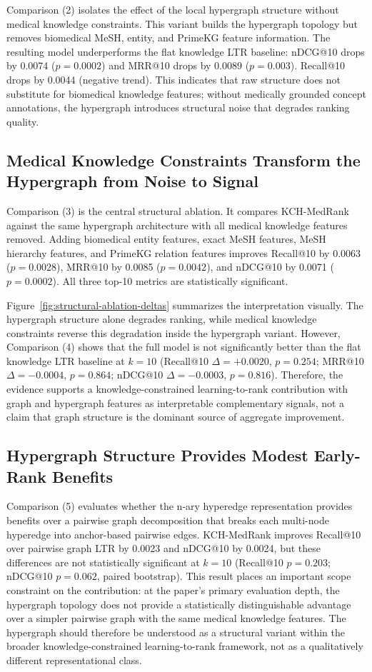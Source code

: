 Comparison (2) isolates the effect of the local hypergraph structure without medical knowledge constraints. This variant builds the hypergraph topology but removes biomedical MeSH, entity, and PrimeKG feature information. The resulting model underperforms the flat knowledge LTR baseline: nDCG@10 drops by 0.0074 ($p = 0.0002$) and MRR@10 drops by 0.0089 ($p = 0.003$). Recall@10 drops by 0.0044 (negative trend). This indicates that raw structure does not substitute for biomedical knowledge features; without medically grounded concept annotations, the hypergraph introduces structural noise that degrades ranking quality.

\subsection{Medical Knowledge Constraints Transform the Hypergraph from Noise to Signal}

Comparison (3) is the central structural ablation. It compares KCH-MedRank against the same hypergraph architecture with all medical knowledge features removed. Adding biomedical entity features, exact MeSH features, MeSH hierarchy features, and PrimeKG relation features improves Recall@10 by 0.0063 ($p = 0.0028$), MRR@10 by 0.0085 ($p = 0.0042$), and nDCG@10 by 0.0071 ($p = 0.0002$). All three top-10 metrics are statistically significant.

Figure~\ref{fig:structural-ablation-deltas} summarizes the interpretation visually. The hypergraph structure alone degrades ranking, while medical knowledge constraints reverse this degradation inside the hypergraph variant. However, Comparison (4) shows that the full model is not significantly better than the flat knowledge LTR baseline at $k{=}10$ (Recall@10 $\Delta=+0.0020$, $p=0.254$; MRR@10 $\Delta=-0.0004$, $p=0.864$; nDCG@10 $\Delta=-0.0003$, $p=0.816$). Therefore, the evidence supports a knowledge-constrained learning-to-rank contribution with graph and hypergraph features as interpretable complementary signals, not a claim that graph structure is the dominant source of aggregate improvement.

\subsection{Hypergraph Structure Provides Modest Early-Rank Benefits}

Comparison (5) evaluates whether the n-ary hyperedge representation provides benefits over a pairwise graph decomposition that breaks each multi-node hyperedge into anchor-based pairwise edges. KCH-MedRank improves Recall@10 over pairwise graph LTR by 0.0023 and nDCG@10 by 0.0024, but these differences are not statistically significant at $k{=}10$ (Recall@10 $p{=}0.203$; nDCG@10 $p{=}0.062$, paired bootstrap). This result places an important scope constraint on the contribution: at the paper's primary evaluation depth, the hypergraph topology does not provide a statistically distinguishable advantage over a simpler pairwise graph with the same medical knowledge features. The hypergraph should therefore be understood as a structural variant within the broader knowledge-constrained learning-to-rank framework, not as a qualitatively different representational class.


